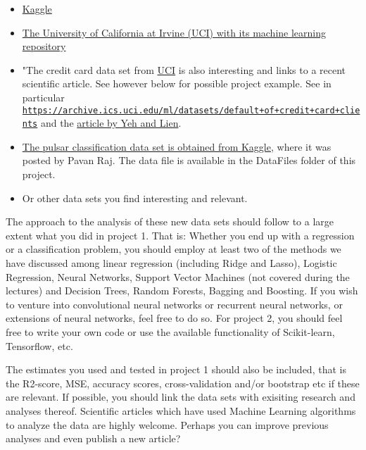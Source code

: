 \documentclass[%
oneside,                 %
final,                   %
10pt]{article}
\begin{document}
\begin{itemize}
\item \href{{https://www.kaggle.com/datasets}}{Kaggle}

\item \href{{https://archive.ics.uci.edu/ml/index.php}}{The University of California at Irvine (UCI) with its machine learning repository}

\item "The credit card data set from \href{{https://archive.ics.uci.edu/ml/index.php}}{UCI} is also interesting and links to a recent scientific article. See however below for possible project example. See in particular \href{{https://archive.ics.uci.edu/ml/datasets/default+of+credit+card+clients}}{\nolinkurl{https://archive.ics.uci.edu/ml/datasets/default+of+credit+card+clients}} and the \href{{https://www.sciencedirect.com/science/article/abs/pii/S0957417407006719}}{article by Yeh and Lien}. 

\item \href{{https://www.kaggle.com/pavanraj159/predicting-pulsar-star-in-the-universe/notebook?scriptVersionId=4487650}}{The pulsar classification data set is obtained from Kaggle}, where it was posted by Pavan Raj. The data file is available in the DataFiles folder of this project.

\item Or other data sets you find interesting and relevant.
\end{itemize}

\noindent
The approach to the analysis of these new data sets should follow to a
large extent what you did in project 1. That is: Whether you end up
with a regression or a classification problem, you should employ at
least two of the methods we have discussed among linear regression
(including Ridge and Lasso), Logistic Regression, Neural Networks,
Support Vector Machines (not covered during the lectures) and Decision Trees, Random Forests, Bagging and Boosting. If you
wish to venture into convolutional neural networks or recurrent neural
networks, or extensions of neural networks, feel free to do so.  For
project 2, you should feel free to write your own code or use the
available functionality of Scikit-learn, Tensorflow, etc.

The estimates you used and tested in project 1 should also be
included, that is the R2-score, MSE, accuracy scores, cross-validation and/or bootstrap etc
if these are relevant.  If possible, you should link the data sets
with exisiting research and analyses thereof. Scientific articles
which have used Machine Learning algorithms to analyze the data are
highly welcome. Perhaps you can improve previous analyses and even
publish a new article?
\end{document}
